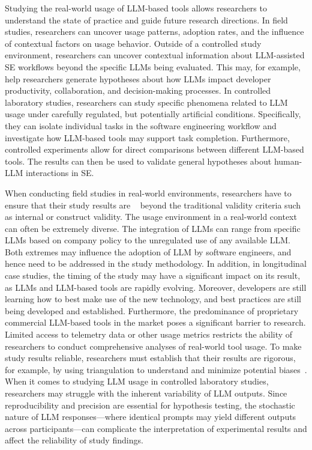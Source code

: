 
Studying the real-world usage of LLM-based tools allows researchers to understand the state of practice and guide future research directions.
In field studies, researchers can uncover usage patterns, adoption rates, and the influence of contextual factors on usage behavior.
Outside of a controlled study environment, researchers can uncover contextual information about LLM-assisted SE workflows beyond the specific LLMs being evaluated.
This may, for example, help researchers generate hypotheses about how LLMs impact developer productivity, collaboration, and decision-making processes.
In controlled laboratory studies, researchers can study specific phenomena related to LLM usage under carefully regulated, but potentially artificial conditions.
Specifically, they can isolate individual tasks in the software engineering workflow and investigate how LLM-based tools may support task completion.
Furthermore, controlled experiments allow for direct comparisons between different LLM-based tools.
The results can then be used to validate general hypotheses about human-LLM interactions in SE.


When conducting field studies in real-world environments, researchers have to ensure that their study results are ~\cite{Sullivan2011-ub} beyond the traditional validity criteria such as internal or construct validity.
The usage environment in a real-world context can often be extremely diverse.
The integration of LLMs can range from specific LLMs based on company policy to the unregulated use of any available LLM. 
Both extremes may influence the adoption of LLM by software engineers, and hence need to be addressed in the study methodology.
In addition, in longitudinal case studies, the timing of the study may have a significant impact on its result, as LLMs and LLM-based tools are rapidly evolving.
Moreover, developers are still learning how to best make use of the new technology, and best practices are still being developed and established.
Furthermore, the predominance of proprietary commercial LLM-based tools in the market poses a significant barrier to research.
Limited access to telemetry data or other usage metrics restricts the ability of researchers to conduct comprehensive analyses of real-world tool usage.
To make study results reliable, researchers must establish that their results are rigorous, for example, by using triangulation to understand and minimize potential biases~\cite{Sullivan2011-ub}.
When it comes to studying LLM usage in controlled laboratory studies, researchers may struggle with the inherent variability of LLM outputs.
Since reproducibility and precision are essential for hypothesis testing, the stochastic nature of LLM responses---where identical prompts may yield different outputs across participants---can complicate the interpretation of experimental results and affect the reliability of study findings.
